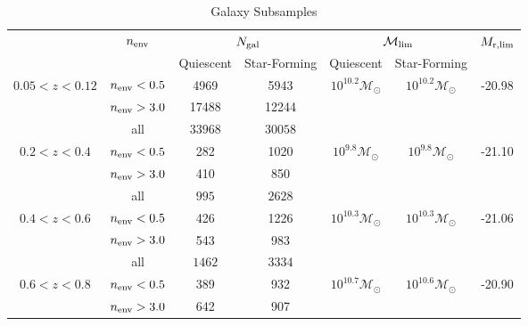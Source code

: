 \documentclass{emulateapj}
\def \lowenvthresh {0.5}
\def \highenvthresh {3.0}
\begin{document}
\begin{table*} 
  \caption{Galaxy Subsamples}
  \label{tab:subsample}
  \begin{center}
    \leavevmode
    \begin{tabular}{ccccccc} \hline \hline              
     &\multicolumn{1}{c}{$n_{\rm{env}}$}        & \multicolumn{2}{c}{$N_{\rm{gal}}$}  & \multicolumn{2}{c}{$\mathcal{M}_{\rm{lim}}$} & $M_{\rm{r}, lim}$ \\ 
    & & Quiescent & Star-Forming & Quiescent & Star-Forming &  \\ \hline 
$0.05 < z < 0.12$ & $n_{\rm{env}} < \lowenvthresh $ & 4969 & 5943 & $10^{10.2} \mathcal{M}_{\odot}$ & $10^{10.2} \mathcal{M}_{\odot}$ & -20.98 \\
               & $n_{\rm{env}} > \highenvthresh $ &17488 & 12244 &                          \\ 
                              & all          &$33968$                       & $30058$                          \\ \hline
$0.2 < z < 0.4$      &$n_{\rm{env}} < \lowenvthresh $           &282                    &1020 & $10^{9.8} \mathcal{M}_{\odot}$ & $10^{9.8} \mathcal{M}_{\odot}$ &-21.10 \\
               &$n_{\rm{env}} > \highenvthresh $            &410                    &850                           \\
               & all                & $995$                      & $2628$                          \\ \hline
$0.4 < z < 0.6$      &$n_{\rm{env}} < \lowenvthresh $           &426                       &1226 & $10^{10.3} \mathcal{M}_{\odot}$ & $10^{10.3} \mathcal{M}_{\odot}$ & -21.06 \\
               &$n_{\rm{env}} > \highenvthresh $            &543                       &983                           \\
               & all               & $1462$                      & $3334$                          \\ \hline
$0.6 < z < 0.8$      &$n_{\rm{env}} < \lowenvthresh $           &389                       &932  & $10^{10.7} \mathcal{M}_{\odot}$ & $10^{10.6} \mathcal{M}_{\odot}$ & -20.90 \\
               &$n_{\rm{env}} > \highenvthresh $            &642                       &907                           \\

\end{tabular}
\end{center}
\end{table*}
\end{document}
